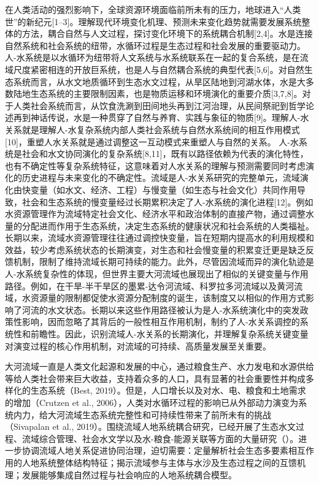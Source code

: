 在人类活动的强烈影响下，全球资源环境面临前所未有的压力，地球进入“人类世”的新纪元[1–3]。理解现代环境变化机理、预测未来变化趋势就需要发展系统整体的方法，耦合自然与人文过程，探讨变化环境下的系统耦合机制[2,4]。水是连接自然系统和社会系统的纽带，水循环过程是生态过程和社会发展的重要驱动力。人-水系统是以水循环为纽带将人文系统与水系统联系在一起的复合系统，是在流域尺度紧密相连的开放巨系统，也是人与自然耦合系统的典型代表[5,6]。对自然生态系统而言，从水文地质循环到生态水文过程，从旱区陆地到河湖水体，水是大多数陆地生态系统的主要限制因素，也是物质运移和环境演化的重要介质[3,7,8]。对于人类社会系统而言，从饮食洗涮到田间地头再到江河治理，从民间祭祀到哲学论述再到神话传说，水是一种贯穿了自然与养育、实践与象征的物质[9]。理解人-水关系就是理解人-水复杂系统内部人类社会系统与自然水系统间的相互作用模式[10]，重塑人水关系就是通过调整这一互动模式来重塑人与自然的关系。
人-水系统是社会和水文协同演化的复杂系统[8,11]，既有以路径依赖为代表的演化特性，也有不确定性等复杂系统特征，这意味着对人水关系的理解与预测需要同时考虑演化的历史进程与未来变化的不确定性。流域是人-水关系研究的完整单元，流域演化由快变量（如水文、经济、工程）与慢变量（如生态与社会文化）共同作用导致，社会和生态系统的慢变量经过长期累积决定了人-水系统的演化进程[12]。例如水资源管理作为流域特定社会文化、经济水平和政治体制的直接产物，通过调整水量的分配进而作用于生态系统，决定生态系统的健康状况和社会系统的人类福祉。长期以来，流域水资源管理往往通过调控快变量，旨在短期内提高水的利用规模和效益，较少考虑系统状态的长期演变，对生态和社会慢变量的积累变迁更是缺乏反馈机制，限制了维持流域长期可持续的能力。此外，尽管因流域而异的演化轨迹是人-水系统复杂性的体现，但世界主要大河流域也展现出了相似的关键变量与作用路径。例如，在干旱-半干旱区的墨累-达令河流域、科罗拉多河流域以及黄河流域，水资源量的限制都促使水资源分配制度的诞生，该制度又以相似的作用方式影响了河流的水文状态。长期以来这些作用路径被认为是人-水系统演化中的突发政策性影响，因而忽略了其背后的一般性相互作用机制，制约了人-水关系调控的系统性和前瞻性。因此，识别流域人-水关系的长期演化，并理解复杂系统关键变量对演变过程的核心作用机制，对流域的可持续、高质量发展至关重要。


大河流域一直是人类文化起源和发展的中心，通过粮食生产、水力发电和水源供给等给人类社会带来巨大收益，支持着众多的人口，具有显著的社会重要性并构成多样化的生态系统（Best, 2019）。但是，人口增长以及对水、电、粮食和土地需求的增加（Crutzen et al., 2006），人类对水循环过程的影响已从外部动力演变为系统内力，给大河流域生态系统完整性和可持续性带来了前所未有的挑战（Sivapalan et al., 2019）。围绕流域人地系统耦合研究，已经开展了生态水文过程、流域综合管理、社会水文学以及水-粮食-能源关联等方面的大量研究（）。进一步协调流域人地关系促进协同治理，迫切需要：定量解析社会生态多要素相互作用的人地系统整体结构特征；揭示流域参与主体与水沙及生态过程之间的互馈机理；发展能够集成自然过程与社会响应的人地系统耦合模型。

